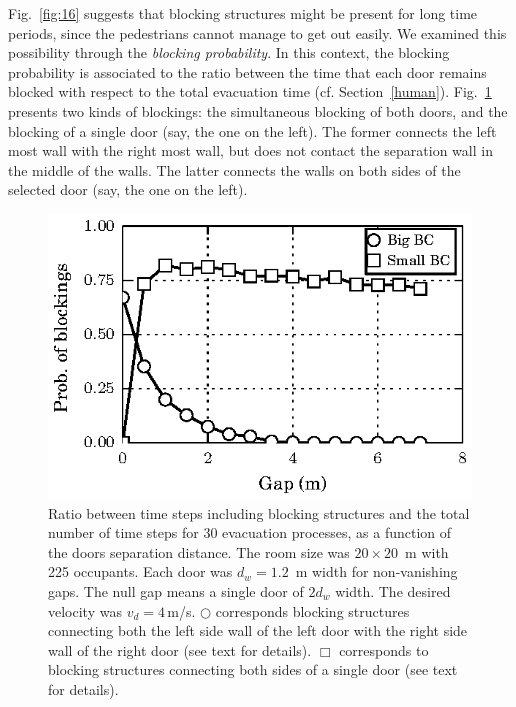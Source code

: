 Fig.~\ref{fig:16} suggests that blocking structures might be present for long 
time periods, since the pedestrians cannot manage to get out easily. We 
examined this possibility through the \textit{blocking probability}. In this 
context, the blocking probability is associated to the ratio between the time 
that each door remains blocked with respect to the total evacuation time (cf. 
Section~\ref{human}). Fig.~\ref{fig:14} presents two kinds of blockings: the 
simultaneous blocking of both doors, and the blocking of a single door (say, 
the one on the left). The former connects the left most wall with the right 
most wall, but does not contact the separation wall in the middle of the walls. 
The latter connects the walls on both sides of the selected door (say, 
the one on the left). \\


\begin{figure}
\includegraphics[width=\columnwidth]{./fig12.eps}
\caption{\label{fig:14} Ratio between time steps including blocking structures 
and the total number of time steps for 30 evacuation processes, as a function 
of the doors separation distance. The room size was $20\times20$~m with 225 
occupants. Each door was $d_w=1.2$~m width for non-vanishing gaps. The null gap 
means a single door of $2d_w$ width. The desired velocity was $v_d=4\,$m/s.  
$\bigcirc$ corresponds blocking structures connecting both the left side wall 
of the left door with the right side wall of the right door (see text for 
details). $\Box$ corresponds to blocking structures connecting both sides of a 
single door (see text for details).   }
\end{figure}

